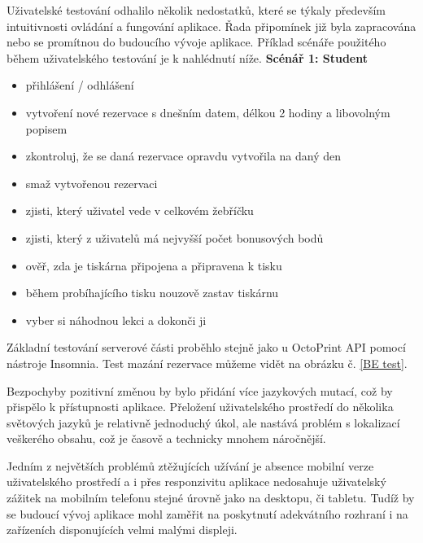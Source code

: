 \documentclass[twoside, 12pt]{article}
\begin{document}
\obrazek


Uživatelské testování odhalilo několik nedostatků, které se týkaly především intuitivnosti ovládání a fungování aplikace. Řada připomínek již byla zapracována nebo se promítnou do budoucího vývoje aplikace. Příklad scénáře použitého během uživatelského testování je k nahlédnutí níže.
\clearpage
\textbf{Scénář 1: Student}
\begin{itemize}
    \item přihlášení / odhlášení
    \item vytvoření nové rezervace s dnešním datem, délkou 2 hodiny a libovolným popisem
    \item zkontroluj, že se daná rezervace opravdu vytvořila na daný den
    \item smaž vytvořenou rezervaci
    \item zjisti, který uživatel vede v celkovém žebříčku
    \item zjisti, který z uživatelů má nejvyšší počet bonusových bodů
    \item ověř, zda je tiskárna připojena a připravena k tisku
    \item během probíhajícího tisku nouzově zastav tiskárnu
    \item vyber si náhodnou lekci a dokonči ji
\end{itemize}


Základní testování serverové části proběhlo stejně jako u OctoPrint API pomocí nástroje Insomnia. Test mazání rezervace můžeme vidět na obrázku č. \ref{BE test}.

\obrazek





Bezpochyby pozitivní změnou by bylo přidání více jazykových mutací, což by přispělo k přístupnosti aplikace. Přeložení uživatelského prostředí do několika světových jazyků je relativně jednoduchý úkol, ale nastává problém s lokalizací veškerého obsahu, což je časově a technicky mnohem náročnější.

Jedním z největších problémů ztěžujících užívání je absence mobilní verze uživatelského prostředí a i přes responzivitu aplikace nedosahuje uživatelský zážitek na mobilním telefonu stejné úrovně jako na desktopu, či tabletu. Tudíž by se budoucí vývoj aplikace mohl zaměřit na poskytnutí adekvátního rozhraní i na zařízeních disponujících velmi malými displeji.
\end{document}
